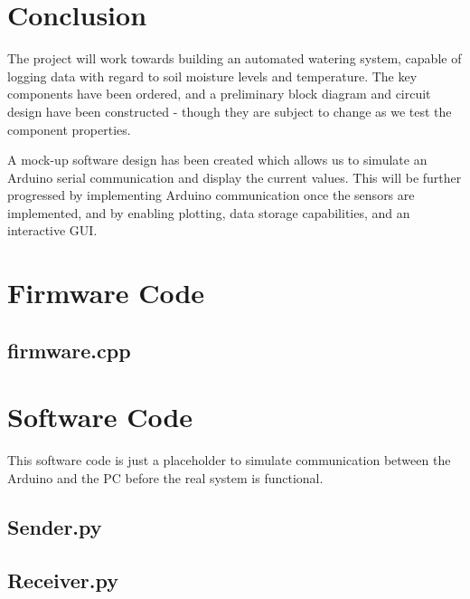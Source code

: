 \documentclass[a4paper,11pt]{article}
\begin{document}
\section{Conclusion}
\label{sec:Conclusion}

The project will work towards building an automated watering system,
capable of logging data with regard to soil moisture levels and temperature.
The key components have been ordered, 
and a preliminary block diagram and circuit design have been constructed - 
though they are subject to change as we test the component properties.

A mock-up software design has been created which allows us to 
simulate an Arduino serial communication and display the current values.
This will be further progressed by implementing 
Arduino communication once the sensors are implemented,
and by enabling plotting, data storage capabilities, and an interactive GUI.

\newpage
\appendix
\section{Firmware Code}
\subsection{firmware.cpp}

\section{Software Code}

This software code is just a placeholder to simulate
communication between the Arduino and the PC
before the real system is functional.

\subsection{Sender.py}



\subsection{Receiver.py}


\end{document}

